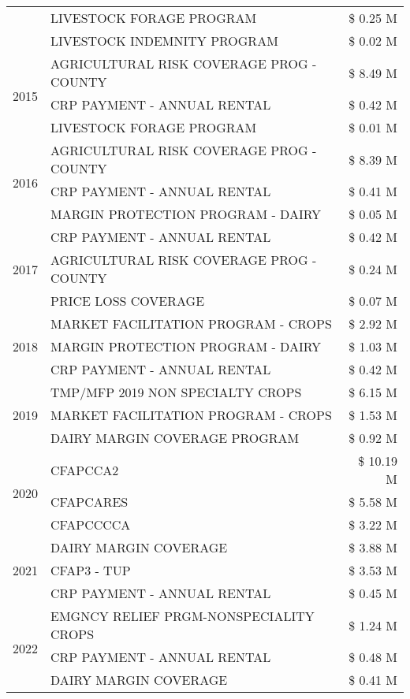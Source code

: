 \begin{tabular}{llr}
 & LIVESTOCK FORAGE PROGRAM & \$ 0.25 M \\
 & LIVESTOCK INDEMNITY PROGRAM & \$ 0.02 M \\
\cline{1-3}
\multirow[t]{3}{*}{2015} & AGRICULTURAL RISK COVERAGE PROG - COUNTY & \$ 8.49 M \\
 & CRP PAYMENT - ANNUAL RENTAL & \$ 0.42 M \\
 & LIVESTOCK FORAGE PROGRAM & \$ 0.01 M \\
\cline{1-3}
\multirow[t]{3}{*}{2016} & AGRICULTURAL RISK COVERAGE PROG - COUNTY & \$ 8.39 M \\
 & CRP PAYMENT - ANNUAL RENTAL & \$ 0.41 M \\
 & MARGIN PROTECTION PROGRAM - DAIRY & \$ 0.05 M \\
\cline{1-3}
\multirow[t]{3}{*}{2017} & CRP PAYMENT - ANNUAL RENTAL & \$ 0.42 M \\
 & AGRICULTURAL RISK COVERAGE PROG - COUNTY & \$ 0.24 M \\
 & PRICE LOSS COVERAGE & \$ 0.07 M \\
\cline{1-3}
\multirow[t]{3}{*}{2018} & MARKET FACILITATION PROGRAM - CROPS & \$ 2.92 M \\
 & MARGIN PROTECTION PROGRAM - DAIRY & \$ 1.03 M \\
 & CRP PAYMENT - ANNUAL RENTAL & \$ 0.42 M \\
\cline{1-3}
\multirow[t]{3}{*}{2019} & TMP/MFP 2019 NON SPECIALTY CROPS & \$ 6.15 M \\
 & MARKET FACILITATION PROGRAM - CROPS & \$ 1.53 M \\
 & DAIRY MARGIN COVERAGE PROGRAM & \$ 0.92 M \\
\cline{1-3}
\multirow[t]{3}{*}{2020} & CFAPCCA2 & \$ 10.19 M \\
 & CFAPCARES & \$ 5.58 M \\
 & CFAPCCCCA & \$ 3.22 M \\
\cline{1-3}
\multirow[t]{3}{*}{2021} & DAIRY MARGIN COVERAGE & \$ 3.88 M \\
 & CFAP3 - TUP & \$ 3.53 M \\
 & CRP PAYMENT - ANNUAL RENTAL & \$ 0.45 M \\
\cline{1-3}
\multirow[t]{3}{*}{2022} & EMGNCY RELIEF PRGM-NONSPECIALITY CROPS & \$ 1.24 M \\
 & CRP PAYMENT - ANNUAL RENTAL & \$ 0.48 M \\
 & DAIRY MARGIN COVERAGE & \$ 0.41 M \\
\cline{1-3}
\bottomrule
\end{tabular}
